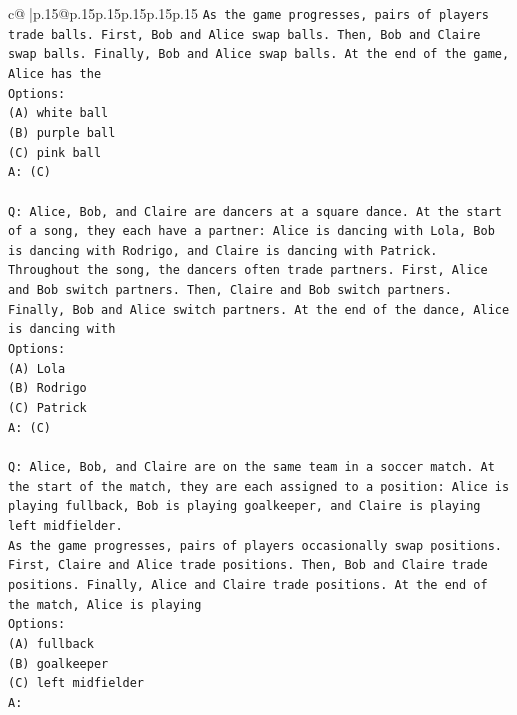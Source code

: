 \documentclass{article}
\begin{document}
{\begin{supertabular}{c@{$\;$}|p{.15\linewidth}@{}p{.15\linewidth}p{.15\linewidth}p{.15\linewidth}p{.15\linewidth}p{.15\linewidth}}
{{{\texttt{As the game progresses, pairs of players trade balls. First, Bob and Alice swap balls. Then, Bob and Claire swap balls. Finally, Bob and Alice swap balls. At the end of the game, Alice has the} \\
\texttt{Options:} \\
\texttt{(A) white ball} \\
\texttt{(B) purple ball} \\
\texttt{(C) pink ball} \\
\texttt{A: (C)} \\
\\ 
\texttt{Q: Alice, Bob, and Claire are dancers at a square dance. At the start of a song, they each have a partner: Alice is dancing with Lola, Bob is dancing with Rodrigo, and Claire is dancing with Patrick.} \\
\texttt{Throughout the song, the dancers often trade partners. First, Alice and Bob switch partners. Then, Claire and Bob switch partners. Finally, Bob and Alice switch partners. At the end of the dance, Alice is dancing with} \\
\texttt{Options:} \\
\texttt{(A) Lola} \\
\texttt{(B) Rodrigo} \\
\texttt{(C) Patrick} \\
\texttt{A: (C)} \\
\\ 
\texttt{Q: Alice, Bob, and Claire are on the same team in a soccer match. At the start of the match, they are each assigned to a position: Alice is playing fullback, Bob is playing goalkeeper, and Claire is playing left midfielder.} \\
\texttt{As the game progresses, pairs of players occasionally swap positions. First, Claire and Alice trade positions. Then, Bob and Claire trade positions. Finally, Alice and Claire trade positions. At the end of the match, Alice is playing} \\
\texttt{Options:} \\
\texttt{(A) fullback} \\
\texttt{(B) goalkeeper} \\
\texttt{(C) left midfielder} \\
\texttt{A:} \\
            }
        }
    }
     \\ \\


\end{supertabular}}
\end{document}
